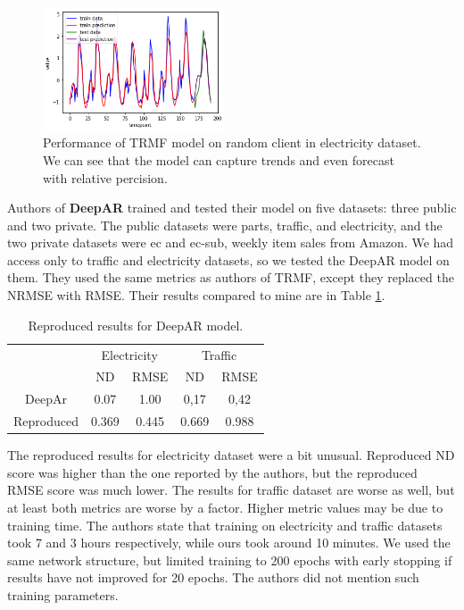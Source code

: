 \documentclass[conference]{IEEEtran}
\begin{document}
\begin{figure}
    \centering
    \includegraphics[width=0.48\textwidth]{trmf_forecast.png}
    \caption{Performance of TRMF model on random client in electricity dataset. We can see that the model can capture trends and even forecast with relative percision.}
    \label{fig:trmf_forecast}
\end{figure}

Authors of \textbf{DeepAR} trained and tested their model on five datasets: three public and two private.
The public datasets were parts, traffic, and electricity, and the two private datasets were ec and ec-sub, weekly item sales from Amazon.
We had access only to traffic and electricity datasets, so we tested the DeepAR model on them.
They used the same metrics as authors of TRMF, except they replaced the NRMSE with RMSE.
Their results compared to mine are in Table \ref{tab:deepar_exp}.

\begin{table}[htb]
    \centering
    \begin{tabular}{c|cc|cc}
         & \multicolumn{2}{c}{Electricity} & \multicolumn{2}{c}{Traffic} \\
         & ND & RMSE & ND & RMSE \\
        \hline
        DeepAr & 0.07 & 1.00 & 0,17 & 0,42 \\
        Reproduced & 0.369 & 0.445 & 0.669 & 0.988 \\
    \end{tabular}
    \caption{Reproduced results for DeepAR model.}
    \label{tab:deepar_exp}
\end{table}

The reproduced results for electricity dataset were a bit unusual.
Reproduced ND score was higher than the one reported by the authors, but the reproduced RMSE score was much lower.
The results for traffic dataset are worse as well, but at least both metrics are worse by a factor.
Higher metric values may be due to training time.
The authors state that training on electricity and traffic datasets took 7 and 3 hours respectively, while ours took around 10 minutes.
We used the same network structure, but limited training to 200 epochs with early stopping if results have not improved for 20 epochs.
The authors did not mention such training parameters.
\end{document}

